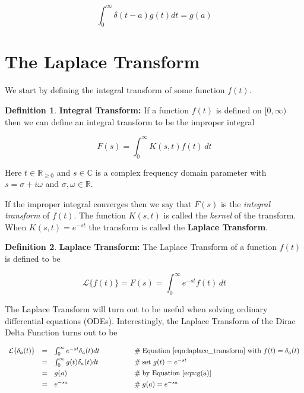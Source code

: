 \documentclass{article}
\theoremstyle{definition}
\newtheorem{definition}{Definition}[section]
\begin{document}
\bigskip
\begin{equation*}
  \int_{0}^{\infty} \delta (t-a) g(t) dt = g(a)
\end{equation*}

\bigskip
\section{The Laplace Transform}
\label{sec:laplace_transform}
We start by defining the integral transform of some function
$f(t)$. 

\bigskip
\begin{definition} 
{\bf Integral Transform:} If a function $f(t)$ is defined on
$[0,\infty)$ then we can define an integral transform to be the
improper integral 
\end{definition}

\begin{equation*}
F(s) = \int_0^\infty K(s,t) f(t) \, dt
\end{equation*}

\bigskip
\noindent
Here $t \in \mathbb{R}_{\ge 0}$ and $s \in \mathbb{C}$ 
is a complex frequency domain parameter with $s = \sigma + i\omega$
and $\sigma, \omega \in \mathbb{R}$.

\bigskip
\noindent
If the improper integral converges then we say that $F(s)$ is the
\emph{integral transform} of $f(t)$. The function $K(s,t)$ is
called the \emph{kernel} of the transform. When $K(s,t) =
e^{-st}$ the transform is called the {\bf Laplace Transform}.

\bigskip
\begin{definition} 
{\bf Laplace Transform:} The Laplace Transform of a function
$f(t)$ is defined to be
\label{def:laplace_transform}
\end{definition}


\begin{equation}
\mathcal{L}\{f(t)\} = F(s) = \int_0^\infty e^{-st} f(t)\, dt
\label{eqn:laplace_transform}
\end{equation}

\bigskip
\noindent
The Laplace Transform will turn out to be useful when solving
ordinary differential equations (ODEs). Interestingly, the
Laplace Transform of the Dirac Delta Function turns out to be

\bigskip
\begin{equation*}
\begin{array}{lllll}
\mathcal{L}\{\delta_a(t)\} 
&=& \int_0^\infty  e^{-st} \delta_a(t) dt
                &\qquad \qquad \mathrel{\#} \text{Equation \ref{eqn:laplace_transform} with $f(t) = \delta_a(t)$} \\ 
[4pt]
&=& \int_0^\infty g(t) \delta_a(t) dt
                &\qquad \qquad \mathrel{\#} \text{set $g(t) = e^{-st}$} \\
[4pt]
&=& g(a)        &\qquad \qquad \mathrel{\#} \text{by Equation \ref{eqn:g(a)}} \\
[4pt]
&=& e^{-sa}     &\qquad \qquad \mathrel{\#} g(a) = e^{-sa}
\end{array}
\end{equation*}
\end{document}

